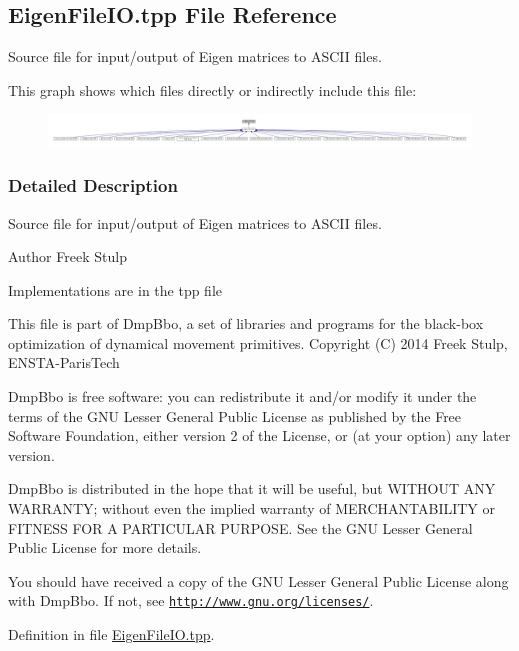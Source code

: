 \hypertarget{EigenFileIO_8tpp}{\subsection{Eigen\+File\+I\+O.\+tpp File Reference}
\label{EigenFileIO_8tpp}
}


Source file for input/output of Eigen matrices to A\+S\+C\+I\+I files.  


This graph shows which files directly or indirectly include this file\+:
\nopagebreak
\begin{figure}[H]
\begin{center}
\leavevmode
\includegraphics[width=350pt]{EigenFileIO_8tpp__dep__incl}
\end{center}
\end{figure}


\subsubsection{Detailed Description}
Source file for input/output of Eigen matrices to A\+S\+C\+I\+I files. 

\begin{DoxyAuthor}{Author}
Freek Stulp
\end{DoxyAuthor}
Implementations are in the tpp file

This file is part of Dmp\+Bbo, a set of libraries and programs for the black-\/box optimization of dynamical movement primitives. Copyright (C) 2014 Freek Stulp, E\+N\+S\+T\+A-\/\+Paris\+Tech

Dmp\+Bbo is free software\+: you can redistribute it and/or modify it under the terms of the G\+N\+U Lesser General Public License as published by the Free Software Foundation, either version 2 of the License, or (at your option) any later version.

Dmp\+Bbo is distributed in the hope that it will be useful, but W\+I\+T\+H\+O\+U\+T A\+N\+Y W\+A\+R\+R\+A\+N\+T\+Y; without even the implied warranty of M\+E\+R\+C\+H\+A\+N\+T\+A\+B\+I\+L\+I\+T\+Y or F\+I\+T\+N\+E\+S\+S F\+O\+R A P\+A\+R\+T\+I\+C\+U\+L\+A\+R P\+U\+R\+P\+O\+S\+E. See the G\+N\+U Lesser General Public License for more details.

You should have received a copy of the G\+N\+U Lesser General Public License along with Dmp\+Bbo. If not, see \href{http://www.gnu.org/licenses/}{\tt http\+://www.\+gnu.\+org/licenses/}. 

Definition in file \hyperlink{EigenFileIO_8tpp_source}{Eigen\+File\+I\+O.\+tpp}.

